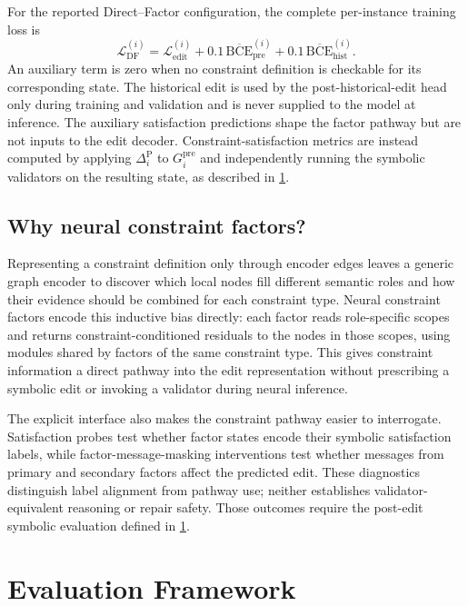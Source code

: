 \documentclass[a4paper,UKenglish,cleveref,autoref,thm-restate]{tgdk-v2021}
\newcommand{\prededit}{\Delta^{\mathrm{P}}}
\begin{document}
For the reported Direct--Factor configuration, the complete per-instance training loss is
\[
\mathcal{L}_{\mathrm{DF}}^{(i)}
=
\mathcal{L}_{\mathrm{edit}}^{(i)}
+
0.1\,\overline{\mathrm{BCE}}_{\mathrm{pre}}^{(i)}
+
0.1\,\overline{\mathrm{BCE}}_{\mathrm{hist}}^{(i)}.
\]
An auxiliary term is zero when no constraint definition is checkable for its corresponding state. The historical edit is used by the post-historical-edit head only during training and validation and is never supplied to the model at inference. The auxiliary satisfaction predictions shape the factor pathway but are not inputs to the edit decoder. Constraint-satisfaction metrics are instead computed by applying \(\prededit_i\) to \(G_i^{\mathrm{pre}}\) and independently running the symbolic validators on the resulting state, as described in \cref{sec:evaluation}.

\subsection{Why neural constraint factors?}
\label{subsec:what-factors-measure}

Representing a constraint definition only through encoder edges leaves a generic graph encoder to discover which local nodes fill different semantic roles and how their evidence should be combined for each constraint type. Neural constraint factors encode this inductive bias directly: each factor reads role-specific scopes and returns constraint-conditioned residuals to the nodes in those scopes, using modules shared by factors of the same constraint type. This gives constraint information a direct pathway into the edit representation without prescribing a symbolic edit or invoking a validator during neural inference.

The explicit interface also makes the constraint pathway easier to interrogate. Satisfaction probes test whether factor states encode their symbolic satisfaction labels, while factor-message-masking interventions test whether messages from primary and secondary factors affect the predicted edit. These diagnostics distinguish label alignment from pathway use; neither establishes validator-equivalent reasoning or repair safety. Those outcomes require the post-edit symbolic evaluation defined in \cref{sec:evaluation}.

\section{Evaluation Framework}
\label{sec:evaluation}
\end{document}
